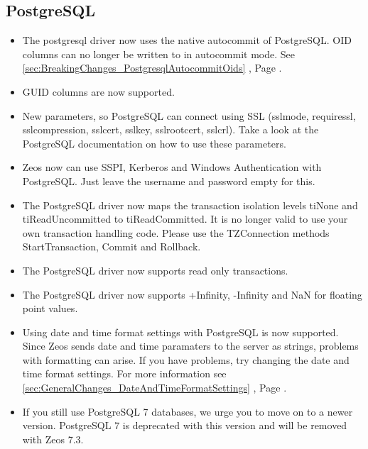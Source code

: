 \documentclass[a4paper,12pt,oneside]{article}
\begin{document}
\subsection{PostgreSQL}
\label{sec:DriverSpecificChanges_Postgresql}
\begin{itemize}
\item 
  The postgresql driver now uses the native autocommit of PostgreSQL. 
	OID columns can no longer be written to in autocommit mode.
	See \ref{sec:BreakingChanges_PostgresqlAutocommitOids} , Page \pageref{sec:BreakingChanges_PostgresqlAutocommitOids}.
\item GUID columns are now supported.
\item 
  New parameters, so PostgreSQL can connect using SSL (sslmode, requiressl, sslcompression, sslcert, sslkey, sslrootcert, sslcrl). 
	Take a look at the PostgreSQL documentation on how to use these parameters.
\item
  Zeos now can use SSPI, Kerberos and Windows Authentication with PostgreSQL.
	Just leave the username and password empty for this.
\item
  The PostgreSQL driver now maps the transaction isolation levels tiNone and tiReadUncommitted to tiReadCommitted.
	It is no longer valid to use your own transaction handling code.
	Please use the TZConnection methods StartTransaction, Commit and Rollback.
\item
  The PostgreSQL driver now supports read only transactions.
\item
  The PostgreSQL driver now supports +Infinity, -Infinity and NaN for floating point values.
\item
  Using date and time format settings with PostgreSQL is now supported.
  Since Zeos sends date and time paramaters to the server as strings, problems with formatting can arise.
	If you have problems, try changing the date and time format settings.
	For more information see \ref{sec:GeneralChanges_DateAndTimeFormatSettings} , Page \pageref{sec:GeneralChanges_DateAndTimeFormatSettings}.
\item
  If you still use PostgreSQL 7 databases, we urge you to move on to a newer version.
	PostgreSQL 7 is deprecated with this version and will be removed with Zeos 7.3.
\end{itemize}
\end{document}
